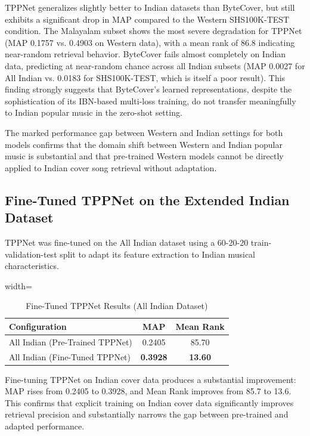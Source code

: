 \documentclass[conference]{IEEEtran}
\begin{document}
TPPNet generalizes slightly better to Indian datasets than ByteCover, but still exhibits a significant drop in MAP compared to the Western SHS100K-TEST condition. The Malayalam subset shows the most severe degradation for TPPNet (MAP 0.1757 vs. 0.4903 on Western data), with a mean rank of 86.8 indicating near-random retrieval behavior. ByteCover fails almost completely on Indian data, predicting at near-random chance across all Indian subsets (MAP 0.0027 for All Indian vs. 0.0183 for SHS100K-TEST, which is itself a poor result). This finding strongly suggests that ByteCover's learned representations, despite the sophistication of its IBN-based multi-loss training, do not transfer meaningfully to Indian popular music in the zero-shot setting.

The marked performance gap between Western and Indian settings for both models confirms that the domain shift between Western and Indian popular music is substantial and that pre-trained Western models cannot be directly applied to Indian cover song retrieval without adaptation.

\subsection{Fine-Tuned TPPNet on the Extended Indian Dataset}

TPPNet was fine-tuned on the All Indian dataset using a 60-20-20 train-validation-test split to adapt its feature extraction to Indian musical characteristics.

\begin{table}[htbp]
    \caption{Fine-Tuned TPPNet Results (All Indian Dataset)}
    \label{tab:tppnet_finetune}
    \centering
    \begin{adjustbox}{width=\columnwidth}
    \begin{tabular}{lcc}
    \toprule
    \textbf{Configuration} & \textbf{MAP} & \textbf{Mean Rank} \\
    \midrule
    All Indian (Pre-Trained TPPNet) & 0.2405 & 85.70 \\
    All Indian (Fine-Tuned TPPNet) & \textbf{0.3928} & \textbf{13.60} \\
    \bottomrule
    \end{tabular}
    \end{adjustbox}
\end{table}

Fine-tuning TPPNet on Indian cover data produces a substantial improvement: MAP rises from 0.2405 to 0.3928, and Mean Rank improves from 85.7 to 13.6. This confirms that explicit training on Indian cover data significantly improves retrieval precision and substantially narrows the gap between pre-trained and adapted performance.
\end{document}
